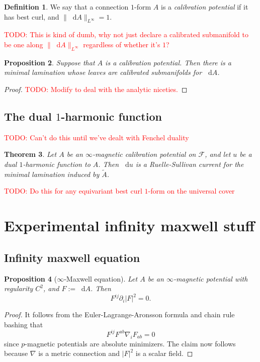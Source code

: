 \documentclass[reqno,11pt]{amsart}
\newcommand*\dif{\mathop{}\!\mathrm{d}}
\newcommand{\dfn}[1]{\emph{#1}\index{#1}}
\newtheorem{theorem}{Theorem}[section]
\newtheorem{proposition}[theorem]{Proposition}
\theoremstyle{definition}
\newtheorem{definition}[theorem]{Definition}
\numberwithin{equation}{section}
\newcommand\todo[1]{\textcolor{red}{TODO: #1}}
\begin{document}
\begin{definition}
We say that a connection $1$-form $A$ is a \dfn{calibration potential} if it has best curl, and $\|\dif A\|_{L^\infty} = 1$.
\end{definition}

\todo{This is kind of dumb, why not just declare a calibrated submanifold to be one along $\|\dif A\|_{L^\infty}$ regardless of whether it's $1$?}

\begin{proposition}
Suppose that $A$ is a calibration potential.
Then there is a minimal lamination whose leaves are calibrated submanifolds for $\dif A$.
\end{proposition}
\begin{proof}
\todo{Modify \cite[Theorem 5.1]{bangert_cui_2017} to deal with the analytic niceties.}
\end{proof}

\subsection{The dual $1$-harmonic function}
\todo{Can't do this until we've dealt with Fenchel duality}

\begin{theorem}
Let $A$ be an $\infty$-magnetic calibration potential on $\mathscr F$, and let $u$ be a dual $1$-harmonic function to $A$.
Then $\dif u$ is a Ruelle-Sullivan current for the minimal lamination induced by $\tilde A$.
\end{theorem}

\todo{Do this for any equivariant best curl $1$-form on the universal cover}


\appendix \section{Experimental infinity maxwell stuff}
\subsection{Infinity maxwell equation}

\begin{proposition}[$\infty$-Maxwell equation]
Let $A$ be an $\infty$-magnetic potential with regularity $C^2$, and $F := \dif A$. Then 
$$F^{ij} \partial_i |F|^2 = 0.$$
\end{proposition}
\begin{proof}
It follows from the Euler-Lagrange-Aronsson formula \cite[Theorem 5.2]{Barron2001} and chain rule bashing that
$$F^{ij} F^{ab} \nabla_i F_{ab} = 0$$
since $p$-magnetic potentials are absolute minimizers.
The claim now follows because $\nabla$ is a metric connection and $|F|^2$ is a scalar field.
\end{proof}
\end{document}

